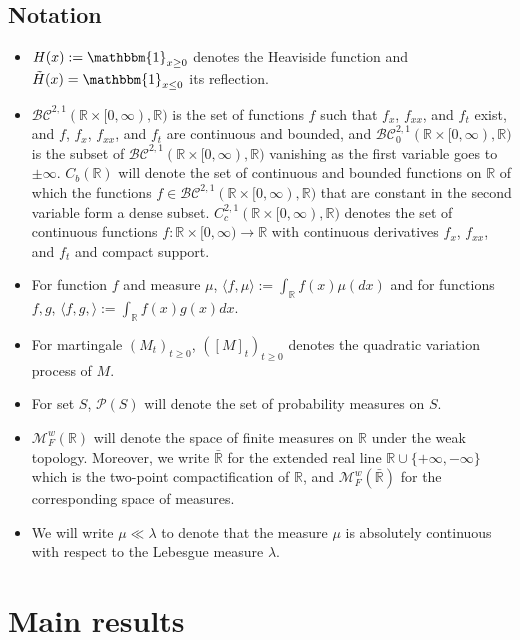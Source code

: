 \documentclass{article}
\newcommand{\B}[1]{\mathbb{#1}}
\newcommand{\C}[1]{\mathcal{#1}}
\newcommand{\is}{\mathbbm{1}}
\begin{document}
\subsection{Notation}
\begin{itemize}
    \item $H(x):=\is_{x\geq 0}$ denotes the Heaviside function and $\tilde{H}(x)=\is_{x\leq 0}$ its reflection.
    \item $\C{BC}^{2,1}(\B{R}\times [0,\infty),\B{R})$ is the set of functions $f$ such that $f_x$, $f_{xx}$, and $f_t$ exist, and $f$, $f_x$, $f_{xx}$, and $f_t$ are continuous and bounded, and $\C{BC}^{2,1}_0(\B{R}\times [0,\infty),\B{R})$ is the subset of $\C{BC}^{2,1}(\B{R}\times [0,\infty),\B{R})$ vanishing as the first variable goes to $\pm \infty$. $C_b(\B{R})$ will denote the set of continuous and bounded functions on $\B{R}$ of which the functions $f\in \C{BC}^{2,1}(\B{R}\times [0,\infty),\B{R})$ that are constant in the second variable form a dense subset. $C_c^{2,1}(\B{R}\times [0,\infty),\B{R})$ denotes the set of continuous functions $f:\B{R}\times [0,\infty)\to\B{R}$ with continuous derivatives $f_x$, $f_{xx}$, and $f_t$ and compact support.
    \item For function $f$ and measure $\mu$, $\langle f,\mu\rangle:=\int_{\B{R}} f(x)\mu(dx)$ and for functions $f,g$, $\langle f,g,\rangle :=\int_\B{R} f(x)g(x)dx$.
    \item For martingale $(M_t)_{t\geq 0}$, $([M]_t)_{t\geq 0}$ denotes the quadratic variation process of $M$. 
    \item For set $S$, $\C{P}(S)$ will denote the set of probability measures on $S$. 
    \item $\C{M}_F^w(\B{R})$ will denote the space of finite measures on $\B{R}$ under the weak topology. Moreover, we write $\bar{\B{R}}$ for the extended real line $\B{R}\cup\{+\infty,-\infty\}$ which is the two-point compactification of $\B{R}$, and $\C{M}_F^w(\bar{\B{R}})$ for the corresponding space of measures.
    \item We will write $\mu \ll \lambda$ to denote that the measure $\mu$ is absolutely continuous with respect to the Lebesgue measure $\lambda$. 
\end{itemize}

\section{Main results}
\end{document}
